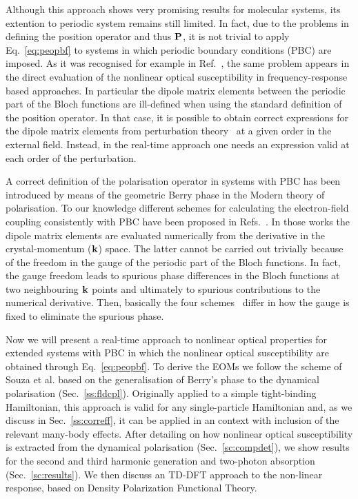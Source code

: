 Although this approach shows very promising results for molecular systems, its extention to periodic system remains still limited.
In fact, due to the problems in defining the position operator and thus ${\bf P}$, it is not trivial to apply Eq.~\eqref{eq:peopbf} to systems in which periodic boundary conditions (PBC) are imposed. As it was recognised for example in Ref.~\cite{PhysRevB.52.14636}, the same problem appears in the direct evaluation of the nonlinear optical susceptibility in frequency-response based approaches. In particular the dipole matrix elements between the periodic part of the Bloch functions are ill-defined when using the standard definition of the  position operator. In that case, it is possible to obtain correct expressions for the dipole matrix elements from perturbation theory~\cite{PhysRevB.52.14636,PhysRevB.48.11705,PhysRevB.82.235201,korbel2015optical} at a given order in the external field. Instead, in the real-time approach one needs an expression valid at each order of the perturbation.

A correct definition of the polarisation operator in systems with PBC has been introduced by means of the geometric Berry phase in the Modern theory of polarisation.\cite{RevModPhys.66.899} 
To our knowledge different schemes for calculating the electron-field coupling consistently with PBC have been proposed in Refs.~\cite{springborg, PhysRevB.76.035213, souza_prb, korbel2015optical}. In those works the dipole matrix elements are evaluated numerically from the derivative in the crystal-momentum (${\bf k}$) space. The latter cannot be carried out trivially because of the freedom in the gauge of the periodic part of the Bloch functions. In fact, the gauge freedom leads to spurious phase differences in the Bloch functions at two neighbouring ${\bf k}$ points and ultimately to spurious contributions to the numerical derivative.
Then, basically the four schemes~\cite{springborg, PhysRevB.76.035213, souza_prb, korbel2015optical} differ in how the gauge is fixed to eliminate the spurious phase.

Now we will present a real-time \ai approach to nonlinear optical properties for extended systems with PBC in which the nonlinear optical susceptibility are obtained through Eq.~\eqref{eq:peopbf}. To derive the EOMs we follow the scheme of Souza et al.\cite{souza_prb} based on the generalisation of Berry's phase to the dynamical polarisation (Sec.~\ref{ss:fldcpl}). Originally applied to a simple tight-binding Hamiltonian, this approach is valid for any single-particle Hamiltonian and, as we discuss in Sec.~\ref{ss:correff}, it can be applied in an \ai context with inclusion of the relevant many-body effects. After detailing on how nonlinear optical susceptibility is extracted from the dynamical polarisation (Sec.~\ref{sc:compdet}), we show results for the second and third harmonic generation and two-photon absorption (Sec.~\ref{sc:results}). We then discuss an TD-DFT approach to the non-linear response, based on Density Polarization Functional Theory. 
   
